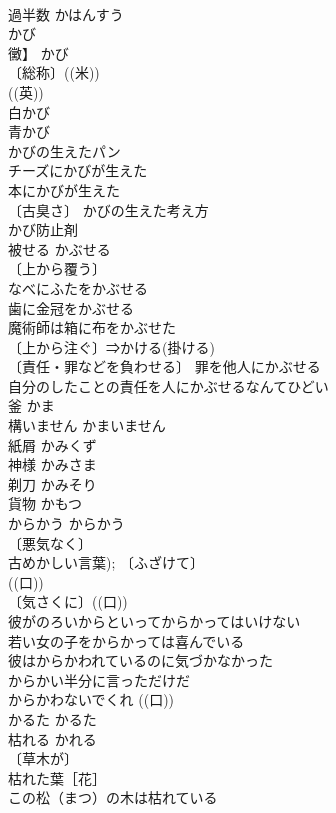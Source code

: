 \documentclass[8pt]{extreport}
\begin{document}
\begin{CJK}{UTF8}{min}
\\	過半数	かはんすう	
\\	かび
\\	黴】	かび	
\\	〔総称〕((米)) 
\\	((英)) 
\\	白かび 
\\	青かび 
\\	かびの生えたパン 
\\	チーズにかびが生えた 
\\	本にかびが生えた 
\\	〔古臭さ〕 かびの生えた考え方 
\\	かび防止剤 
\\	被せる	かぶせる	
\\	〔上から覆う〕
\\	なべにふたをかぶせる 
\\	歯に金冠をかぶせる 
\\	魔術師は箱に布をかぶせた 
\\	〔上から注ぐ〕⇒かける(掛ける)
\\	〔責任・罪などを負わせる〕 罪を他人にかぶせる 
\\	自分のしたことの責任を人にかぶせるなんてひどい 
\\	釜	かま	
\\	構いません	かまいません	
\\	紙屑	かみくず	
\\	神様	かみさま	
\\	剃刀	かみそり	
\\	貨物	かもつ	
\\	からかう	からかう	
\\	〔悪気なく〕
\\	古めかしい言葉); 〔ふざけて〕
\\	((口)) 
\\	〔気さくに〕((口)) 
\\	彼がのろいからといってからかってはいけない 
\\	若い女の子をからかっては喜んでいる 
\\	彼はからかわれているのに気づかなかった 
\\	からかい半分に言っただけだ 
\\	からかわないでくれ ((口)) 
\\	かるた	かるた	
\\	枯れる	かれる	
\\	〔草木が〕
\\	枯れた葉［花］ 
\\	この松（まつ）の木は枯れている 

\end{CJK}
\end{document}
